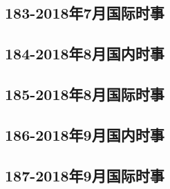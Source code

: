 \subsection{183-2018年7月国际时事}

\subsection{184-2018年8月国内时事}

\subsection{185-2018年8月国际时事}

\subsection{186-2018年9月国内时事}

\subsection{187-2018年9月国际时事}

